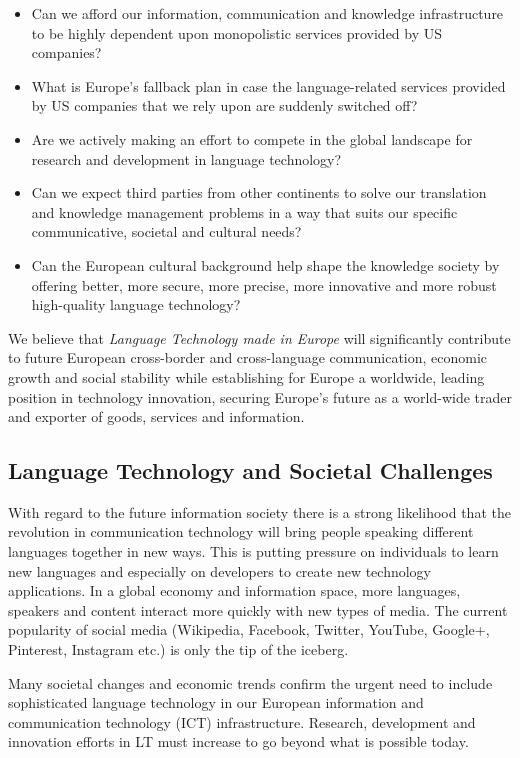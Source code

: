 \documentclass[10pt, plain]{../../metanetpaper}
\begin{document}
\begin{multicols}{2}
\begin{itemize}
\item Can we afford our information, communication and knowledge infrastructure to be highly dependent upon monopolistic services provided by US companies?
\item What is Europe's fallback plan in case the language-related services provided by US companies that we rely upon are suddenly switched off?
\item Are we actively making an effort to compete in the global landscape for research and development in language technology?
\item Can we expect third parties from other continents to solve our translation and knowledge management problems in a way that suits our specific communicative, societal and cultural needs?
\item Can the European cultural background help shape the knowledge society by offering better, more secure, more precise, more innovative and more robust high-quality language technology?
\end{itemize}

We believe that \emph{Language Technology made in Europe} will significantly contribute to future European cross-border and cross-language communication, economic growth and social stability while establishing for Europe a worldwide, leading position in technology innovation, securing Europe's future as a world-wide trader and exporter of goods, services and information.

\subsection{Language Technology and Societal Challenges}
\label{sec:what-soci-challenges}

With regard to the future information society there is a strong likelihood that the revolution in communication technology will bring people speaking different languages together in new ways. This is putting pressure on individuals to learn new languages and especially on developers to create new technology applications. In a global economy and information space, more languages, speakers and content interact more quickly with new types of media. The current popularity of social media (Wikipedia, Facebook, Twitter, YouTube, Google+, Pinterest, Instagram etc.) is only the tip of the iceberg.

Many societal changes and economic trends confirm the urgent need to include sophisticated language technology in our European information and communication technology (ICT) infrastructure. Research, development and innovation efforts in LT must increase to go beyond what is possible today.


\end{multicols}
\end{document}

